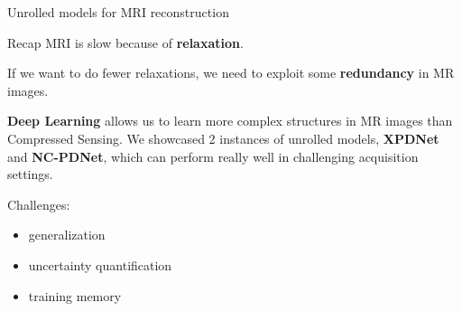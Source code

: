 \begin{frame}
\begin{figure}
    \end{figure}

\end{frame}

\begin{frame}{Unrolled models for MRI reconstruction}
    \begin{block}{Recap}
        MRI is slow because of \textbf{relaxation}.

        \pause
        If we want to do fewer relaxations, we need to exploit some \textbf{redundancy} in MR images.

        \pause
        \textbf{Deep Learning} allows us to learn more complex structures in MR images than Compressed Sensing.
        We showcased 2 instances of unrolled models, \textbf{XPDNet} and \textbf{NC-PDNet}, which can perform really well in challenging acquisition settings.
    \end{block}

    \pause
    Challenges:
    \begin{itemize}
        \item generalization
        \item uncertainty quantification
        \item training memory
    \end{itemize}
\end{frame}
